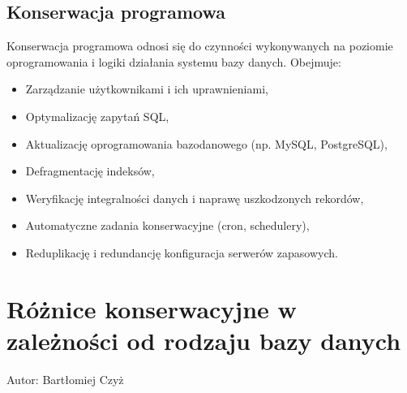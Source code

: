 \documentclass[a4paper,11pt,polish]{sphinxmanual}
\begin{document}
\subsection{Konserwacja programowa}
\label{\detokenize{Kontrola_i_konserwacja/kontrola_i_konserwacja:konserwacja-programowa}}
\sphinxAtStartPar
Konserwacja programowa odnosi się do czynności wykonywanych na poziomie oprogramowania i logiki działania systemu bazy danych. Obejmuje:
\begin{itemize}
\item {} 
\sphinxAtStartPar
Zarządzanie użytkownikami i ich uprawnieniami,

\item {} 
\sphinxAtStartPar
Optymalizację zapytań SQL,

\item {} 
\sphinxAtStartPar
Aktualizację oprogramowania bazodanowego (np. MySQL, PostgreSQL),

\item {} 
\sphinxAtStartPar
Defragmentację indeksów,

\item {} 
\sphinxAtStartPar
Weryfikację integralności danych i naprawę uszkodzonych rekordów,

\item {} 
\sphinxAtStartPar
Automatyczne zadania konserwacyjne (cron, schedulery),

\item {} 
\sphinxAtStartPar
Reduplikację i redundancję \sphinxhyphen{} konfiguracja serwerów zapasowych.

\end{itemize}


\section{Różnice konserwacyjne w zależności od rodzaju bazy danych}
\label{\detokenize{Kontrola_i_konserwacja/kontrola_i_konserwacja:roznice-konserwacyjne-w-zaleznosci-od-rodzaju-bazy-danych}}
\sphinxAtStartPar
Autor: Bartłomiej Czyż
\end{document}
